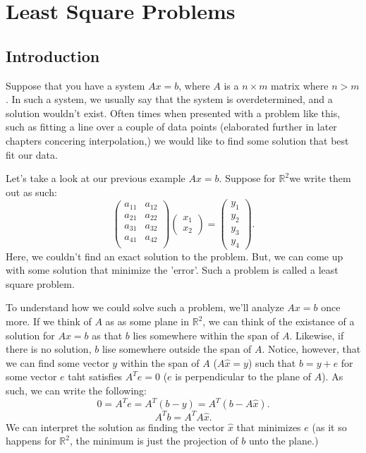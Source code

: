 \documentclass[5pt, a4paper]{article}
\begin{document}
    \section{Least Square Problems} 
    \subsection*{Introduction}
    Suppose that you have a system $Ax = b$, where $A$ is a $n\times m$ matrix
    where $n > m$. In such a system, we usually say that the system is
    overdetermined, and a solution wouldn't exist. Often times when presented
    with a problem like this, such as fitting a line over a couple of data
    points (elaborated further in later chapters concering interpolation,) we
    would like to find some solution that best fit our data.

    Let's take a look at our previous example $Ax = b$. Suppose for
    $\mathbb{R}^{2}$we write them out as such:  \[
        \begin{pmatrix} 
            a_{11} & a_{12}  \\
            a_{21} & a_{22}  \\
            a_{31} & a_{32}  \\
            a_{41} & a_{42} \\
        \end{pmatrix}    
        \begin{pmatrix} 
            x_1 \\ 
            x_2
        \end{pmatrix} 
        = \begin{pmatrix} y_1 \\ y_2 \\ y_3 \\y_4 \end{pmatrix} 
    .\] 
     Here, we couldn't find an exact solution to the problem. But, we can come
     up with some solution that minimize the 'error'. Such a problem is called a
     least square problem. 

     To understand how we could solve such a problem, we'll analyze $Ax = b$
     once more. If we think of $A$ as as some plane in $\mathbb{R}^{2}$, we can
     think of the existance of a solution for $Ax = b$ as that  $b$ lies
     somewhere within the span of $A$. Likewise, if there is no solution, $b$
     lise somewhere outside the span of $A$. Notice, however, that we can find
     some vector $y$ within the span of $A$ ($A\hat{x} = y$) such that $b = y + e$ for some
     vector $e$ taht satisfies  $A^{T}e = 0$ ($e$ is perpendicular to  the plane
     of $A$). As such, we can write the following: \[
     0 = A^{T}e = A^{T}(b - y) = A^{T}(b - A \hat{x})
     .\] 
     \[
     A^{T}b = A^{T}A \hat{x}
     .\] 
     We can interpret the solution as finding the vector $\hat{x}$ that
     minimizes $e$ (as it so happens for $\mathbb{R}^{2}$, the minimum is just
     the projection of $b$ unto the plane.)
\end{document}
